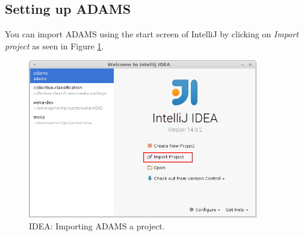 \subsection{Setting up ADAMS}
You can import ADAMS using the start screen of IntelliJ by clicking on
\textit{Import project} as seen in Figure \ref{intellij-import_project-adams2}.
\begin{figure}[htb]
  \centering
  \includegraphics[width=10.0cm]{images/intellij-import_project-adams2.png}
  \caption{IDEA: Importing ADAMS a project.}
  \label{intellij-import_project-adams2}
\end{figure}

